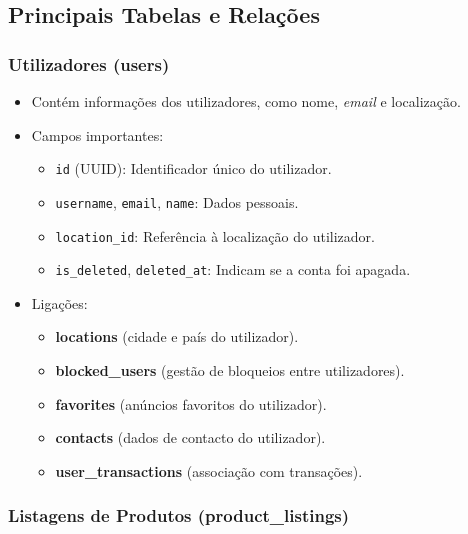 \documentclass[a4paper, 12pt]{article} %
\begin{document}
\subsection{\textbf{Principais Tabelas e Relações}}

\subsubsection{\textbf{Utilizadores (users)}}

\begin{itemize}

	\item Contém informações dos utilizadores, como nome, \textit{email} e localização.

	\item Campos importantes:
	\begin{itemize}
		\item \verb|id| (UUID): Identificador único do utilizador.
		\item \verb|username|, \verb|email|, \verb|name|: Dados pessoais.
		\item \verb|location_id|: Referência à localização do utilizador.
		\item \verb|is_deleted|, \verb|deleted_at|: Indicam se a conta foi apagada.
	\end{itemize}
	\item Ligações:
	\begin{itemize}
		\item \textbf{locations} (cidade e país do utilizador).
		\item \textbf{blocked\_users} (gestão de bloqueios entre utilizadores).
		\item \textbf{favorites} (anúncios favoritos do utilizador).
		\item \textbf{contacts} (dados de contacto do utilizador).
		\item \textbf{user\_transactions} (associação com transações).
	\end{itemize}
\end{itemize}

\subsubsection{\textbf{Listagens de Produtos (product\_listings)}}
\end{document}
